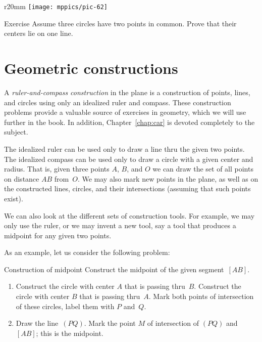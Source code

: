 {

\begin{wrapfigure}{r}{20mm}
\vskip-8mm
\centering
\texttt{[image: mppics/pic-62]}
\end{wrapfigure}

\begin{thm}{Exercise}\label{ex:tangent-circles-3}
Assume three circles have two points in common.
Prove that their centers lie on one line.
\end{thm}

}

\section*{Geometric constructions}

A \emph{ruler-and-compass construction} in the plane is a construction of points, lines, and circles using only an idealized ruler and compass.
These construction problems provide a valuable source of exercises in geometry, 
which we will use further in the book.
In addition, Chapter~\ref{chap:car} is devoted completely to the subject.

The idealized ruler can be used only to draw a line thru the given two points.
The idealized compass can be used only to draw a circle with a given center and radius.
That is, given three points $A$, $B$, and $O$ 
we can draw the set of all points on distance $AB$ from~$O$.
We may also mark new points in the plane,
as well as on the constructed lines, circles, 
and their intersections (assuming that such points exist).

We can also look at the different sets of construction tools.
For example,
we may only use the ruler,
or we may invent a new tool, 
say a tool that produces a midpoint for any given two points.

As an example, let us consider the following problem:

\begin{thm}{Construction of midpoint}
Construct the midpoint of the given segment~$[AB]$.
\end{thm}

\begin{enumerate}[1.]
\item Construct the circle 
with center $A$ 
that is passing thru~$B$.
Construct the circle 
with center $B$ 
that is passing thru~$A$.
 Mark both points of intersection of these circles, label them with $P$ and~$Q$.
\item Draw the line~$(PQ)$.
Mark the point $M$ of intersection of $(PQ)$ and $[AB]$; this is the midpoint.
\end{enumerate}


